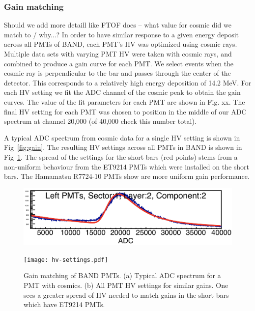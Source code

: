 \documentclass[3p,final,twocolumn]{elsarticle}
\begin{document}
\subsubsection{Gain matching}
{\color{red} Should we add more detaill like FTOF does -- what value for cosmic did we match to / why...?}
In order to have similar response to a given energy deposit across all PMTs of BAND, each PMT's HV was optimized using
cosmic rays. Multiple data sets with varying PMT HV were taken with cosmic rays, and combined to produce a gain curve for 
each PMT. 
We select events when the cosmic ray is perpendicular to the bar and passes through the center of the detector. This corresponds to a relatively high energy deposition of 14.2 \si{\mega\eV}. For each HV setting we fit the ADC channel of the cosmic peak to obtain the gain curves. The value of the fit parameters for each PMT are shown in Fig. xx. The final HV setting for each PMT was chosen to position in the middle of our ADC spectrum at channel 20,000 (of 40,000 {\color{red} check this number} total).

A typical ADC spectrum from cosmic data for a single HV setting %
is shown in Fig~\ref{fig:gain}. The resulting HV settings across all PMTs in BAND is 
shown in Fig~\ref{fig:hv_settings}. The spread of the settings for the short bars (red points) stems from a non-uniform behaviour from the ET9214 PMTs which were installed on the short bars. The Hamamatsu R7724-10 PMTs show are more uniform gain performance.
\begin{figure}[h!]
	\centering
		\begin{minipage}{0.48\textwidth}
			\includegraphics[width=\textwidth]{adc-spectra.png}\\
			\subcaption{}
			\label{fig:gain}
		\end{minipage}
		\begin{minipage}{0.48\textwidth}
			\texttt{[image: hv-settings.pdf]}
			\subcaption{}
		\label{fig:hv_settings}
		\end{minipage}
		\caption{Gain matching of BAND PMTs. (a) Typical ADC spectrum for a PMT with cosmics. (b) All PMT HV settings for similar gains. One sees a greater 
		spread of HV needed to match gains in the short bars which have ET9214 PMTs.}
\end{figure}
\end{document}

